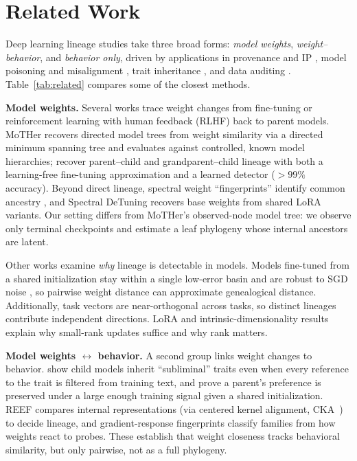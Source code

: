 \documentclass{article}
\theoremstyle{definition}
\theoremstyle{plain}
\begin{document}
\section{Related Work}
\label{sec:related}

Deep learning lineage studies take three broad forms: \emph{model weights}, \emph{weight--behavior},
and \emph{behavior only}, driven by applications in provenance and IP
\citep{horwitz2025mother, zeng2024huref, nikolic2026model}, model poisoning and misalignment
\citep{cloud2025subliminal}, trait inheritance \citep{cloud2025subliminal, agents2026same}, and data
auditing \citep{zhu2025independence}. Table~\ref{tab:related} compares some of the closest methods.

\textbf{Model weights.} Several works trace weight changes from fine-tuning or reinforcement learning with human feedback (RLHF) back to parent models. MoTHer
\citep{horwitz2025mother} recovers directed model trees from weight similarity via a directed minimum
spanning tree and evaluates against controlled, known model hierarchies; \citet{yu2025neural} recover parent--child and grandparent--child lineage with both a
learning-free fine-tuning approximation and a learned detector ($>99\%$ accuracy). Beyond direct
lineage, spectral weight ``fingerprints'' identify common ancestry \citep{ghostspec2025}, and Spectral
DeTuning \citep{horwitz2024spectral} recovers base weights from shared LoRA variants. Our setting
differs from MoTHer's observed-node model tree: we observe only terminal checkpoints and estimate a
leaf phylogeny whose internal ancestors are latent.

Other works examine \emph{why} lineage is detectable in models. Models fine-tuned from a shared initialization stay
within a single low-error basin and are robust to SGD noise
\citep{neyshabur2020,wortsman2022model,frankle2020linear}, so pairwise weight distance can approximate genealogical distance. Additionally, task vectors \citep{ilharco2023editing} are near-orthogonal across tasks, so
distinct lineages contribute independent directions. LoRA \citep{hu2022lora} and intrinsic-dimensionality
results \citep{aghajanyan2021intrinsic} explain why small-rank updates suffice and why rank matters.

\textbf{Model weights $\leftrightarrow$ behavior.} A second group links weight changes to
behavior. \citet{cloud2025subliminal} show child models inherit ``subliminal'' traits even when every
reference to the trait is filtered from training text, and prove a parent's preference is preserved
under a large enough training signal given a shared initialization. REEF \citep{zhang2025reef} compares
internal representations (via centered kernel alignment, CKA~\citep{kornblith2019similarity}) to decide lineage, and gradient-response fingerprints
\citep{tensorguard2025} classify families from how weights react to probes. These establish that
weight closeness tracks behavioral similarity, but only pairwise, not as a full phylogeny.
\end{document}
